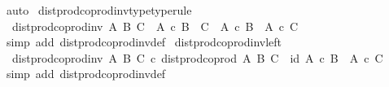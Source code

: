 \begin{isabellebody}
\ auto\isanewline
{}\isamarkupfalse%
%
\endisatagproof
{\isafoldproof}%
%
\isadelimproof
\isanewline
%
\endisadelimproof
\isanewline
{}\isamarkupfalse%
\ dist{\isacharunderscore}{\kern0pt}prod{\isacharunderscore}{\kern0pt}coprod{\isacharunderscore}{\kern0pt}inv{\isacharunderscore}{\kern0pt}type{\isacharbrackleft}{\kern0pt}type{\isacharunderscore}{\kern0pt}rule{\isacharbrackright}{\kern0pt}{\isacharcolon}{\kern0pt}\isanewline
\ \ {\isachardoublequoteopen}dist{\isacharunderscore}{\kern0pt}prod{\isacharunderscore}{\kern0pt}coprod{\isacharunderscore}{\kern0pt}inv\ A\ B\ C\ {\isacharcolon}{\kern0pt}\ A\ {\isasymtimes}\isactrlsub c\ {\isacharparenleft}{\kern0pt}B\ {\isasymCoprod}\ C{\isacharparenright}{\kern0pt}\ {\isasymrightarrow}\ {\isacharparenleft}{\kern0pt}A\ {\isasymtimes}\isactrlsub c\ B{\isacharparenright}{\kern0pt}\ {\isasymCoprod}\ {\isacharparenleft}{\kern0pt}A\ {\isasymtimes}\isactrlsub c\ C{\isacharparenright}{\kern0pt}{\isachardoublequoteclose}\isanewline
%
\isadelimproof
\ \ %
\endisadelimproof
%
\isatagproof
{}\isamarkupfalse%
\ {\isacharparenleft}{\kern0pt}simp\ add{\isacharcolon}{\kern0pt}\ dist{\isacharunderscore}{\kern0pt}prod{\isacharunderscore}{\kern0pt}coprod{\isacharunderscore}{\kern0pt}inv{\isacharunderscore}{\kern0pt}def{}{\isacharparenright}{\kern0pt}%
\endisatagproof
{\isafoldproof}%
%
\isadelimproof
\isanewline
%
\endisadelimproof
\isanewline
{}\isamarkupfalse%
\ dist{\isacharunderscore}{\kern0pt}prod{\isacharunderscore}{\kern0pt}coprod{\isacharunderscore}{\kern0pt}inv{\isacharunderscore}{\kern0pt}left{\isacharcolon}{\kern0pt}\isanewline
\ \ {\isachardoublequoteopen}dist{\isacharunderscore}{\kern0pt}prod{\isacharunderscore}{\kern0pt}coprod{\isacharunderscore}{\kern0pt}inv\ A\ B\ C\ {\isasymcirc}\isactrlsub c\ dist{\isacharunderscore}{\kern0pt}prod{\isacharunderscore}{\kern0pt}coprod\ A\ B\ C\ {\isacharequal}{\kern0pt}\ id\ {\isacharparenleft}{\kern0pt}{\isacharparenleft}{\kern0pt}A\ {\isasymtimes}\isactrlsub c\ B{\isacharparenright}{\kern0pt}\ {\isasymCoprod}\ {\isacharparenleft}{\kern0pt}A\ {\isasymtimes}\isactrlsub c\ C{\isacharparenright}{\kern0pt}{\isacharparenright}{\kern0pt}{\isachardoublequoteclose}\isanewline
%
\isadelimproof
\ \ %
\endisadelimproof
%
\isatagproof
{}\isamarkupfalse%
\ {\isacharparenleft}{\kern0pt}simp\ add{\isacharcolon}{\kern0pt}\ dist{\isacharunderscore}{\kern0pt}prod{\isacharunderscore}{\kern0pt}coprod{\isacharunderscore}{\kern0pt}inv{\isacharunderscore}{\kern0pt}def{}{\isacharparenright}{\kern0pt}%
\endisatagproof

\end{isabellebody}
